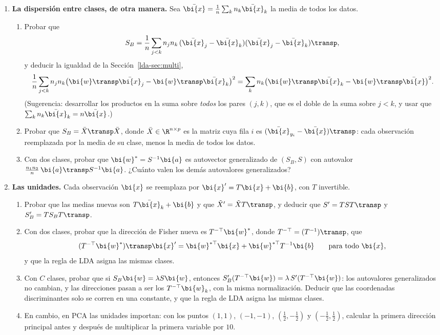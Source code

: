 \begin{enumerate}[leftmargin=*,label=\textbf{\thechapter.\arabic*},ref=\thechapter.\arabic*,itemsep=4pt]
\item {} \textbf{La dispersión entre clases, de otra
manera.}\label{lda-ej:SB} Sea $\bar{\bi{x}}=\frac1n\sum_kn_k\bar{\bi{x}}_k$ la media de
todos los datos.
\begin{enumerate}[label=(\alph*)]
\item Probar que
\[
S_B=\frac1n\sum_{j<k}n_jn_k\,(\bar{\bi{x}}_j-\bar{\bi{x}}_k)(\bar{\bi{x}}_j-\bar{\bi{x}}_k)\transp ,
\]
y deducir la igualdad de la Sección~\ref{lda-sec:multi},
\[
\frac1n\sum_{j<k}n_jn_k\bigl(\bi{w}\transp\bar{\bi{x}}_j-\bi{w}\transp\bar{\bi{x}}_k\bigr)^2=\sum_kn_k\bigl(\bi{w}\transp\bar{\bi{x}}_k-\bi{w}\transp\bar{\bi{x}}\bigr)^2 .
\]
(Sugerencia: desarrollar los productos en la suma sobre \emph{todos} los
pares $(j,k)$, que es el doble de la suma sobre $j<k$, y usar que
$\sum_kn_k\bar{\bi{x}}_k=n\bar{\bi{x}}$.)
\item Probar que $S_B=\bar X\transp\bar X$, donde $\bar X\in\R^{n\times p}$ es la
matriz cuya fila $i$ es $(\bar{\bi{x}}_{y_i}-\bar{\bi{x}})\transp$: cada observación
reemplazada por la media de su clase, menos la media de todos los datos.
\item Con dos clases, probar que $\bi{w}^\ast=S^{-1}\bi{a}$ es autovector generalizado
de $(S_B,S)$ con autovalor $\frac{n_1n_2}{n}\,\bi{a}\transp S^{-1}\bi{a}$. ¿Cuánto valen
los demás autovalores generalizados?
\end{enumerate}

\item {} \textbf{Las unidades.}\label{lda-ej:unidades}
Cada observación $\bi{x}$ se reemplaza por $\bi{x}'=T\bi{x}+\bi{b}$, con $T$ invertible.
\begin{enumerate}[label=(\alph*)]
\item Probar que las medias nuevas son $T\bar{\bi{x}}_k+\bi{b}$ y que
$\tilde X'=\tilde XT\transp$, y deducir que $S'=TST\transp$ y
$S_B'=TS_BT\transp$.
\item Con dos clases, probar que la dirección de Fisher nueva es
$T^{-\top}\bi{w}^\ast$, donde $T^{-\top}=(T^{-1})\transp$, que
\[
(T^{-\top}\bi{w}^\ast)\transp \bi{x}'=\bi{w}^{\ast\top}\bi{x}+\bi{w}^{\ast\top}T^{-1}\bi{b}\qquad\text{para todo }\bi{x},
\]
y que la regla de LDA asigna las mismas clases.
\item Con $C$ clases, probar que si $S_B\bi{w}=\lambda S\bi{w}$, entonces
$S_B'(T^{-\top}\bi{w})=\lambda\,S'(T^{-\top}\bi{w})$: los autovalores generalizados no
cambian, y las direcciones pasan a ser los $T^{-\top}\bi{w}_k$, con la misma
normalización. Deducir que las coordenadas discriminantes solo se corren en
una constante, y que la regla de LDA asigna las mismas clases.
\item En cambio, en PCA las unidades importan: con los puntos $(1,1)$,
$(-1,-1)$, $(\frac12,-\frac12)$ y $(-\frac12,\frac12)$, calcular la primera
dirección principal antes y después de multiplicar la primera variable por
$10$.
\end{enumerate}


\end{enumerate}
